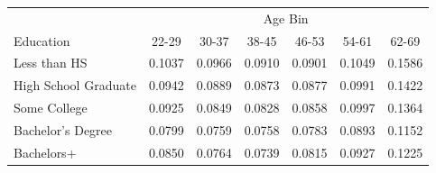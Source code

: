 \begin{tabular}{lcccccc}
\hline\hline
 & \multicolumn{6}{c}{Age Bin} \\
Education & 22-29 & 30-37 & 38-45 & 46-53 & 54-61 & 62-69 \\
\hline
Less than HS&0.1037&0.0966&0.0910&0.0901&0.1049&0.1586\\
High School Graduate&0.0942&0.0889&0.0873&0.0877&0.0991&0.1422\\
Some College&0.0925&0.0849&0.0828&0.0858&0.0997&0.1364\\
Bachelor's Degree&0.0799&0.0759&0.0758&0.0783&0.0893&0.1152\\
Bachelors+&0.0850&0.0764&0.0739&0.0815&0.0927&0.1225\\
\hline\hline
\end{tabular}
